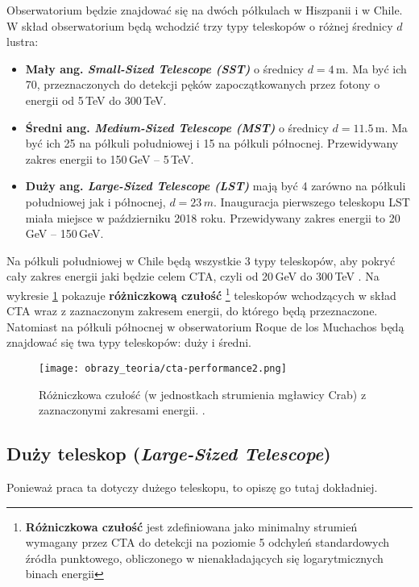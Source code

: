 \documentclass[a4paper,11pt,twoside]{article}
\begin{document}
Obserwatorium będzie znajdować się na dwóch półkulach w Hiszpanii i w Chile. W skład obserwatorium będą wchodzić trzy typy teleskopów o różnej średnicy $d$ lustra:
\begin{itemize}
\item {\bf{Mały} ang. \textsl{Small-Sized Telescope (SST)}} o średnicy $d = 4$\,m. Ma być ich 70, przeznaczonych do detekcji pęków zapoczątkowanych przez fotony o energii od 5\,TeV do 300\,TeV.
\item {\bf{Średni} ang. \textsl{Medium-Sized Telescope (MST)}} o średnicy $d = 11.5$\,m. Ma być ich 25 na półkuli południowej i 15 na półkuli północnej. Przewidywany zakres energii to 150\,GeV -- 5\,TeV.
\item {\bf{Duży} ang. \textsl{Large-Sized Telescope (LST)}} mają być 4 zarówno na półkuli południowej jak i północnej, $d = 23\,m$. Inauguracja pierwszego teleskopu LST miała miejsce w październiku 2018 roku. Przewidywany zakres energii to 20\,GeV -- 150\,GeV.
\end{itemize}
Na półkuli południowej w Chile będą wszystkie 3 typy teleskopów,
 aby pokryć cały zakres energii jaki będzie celem CTA, czyli od 20\,GeV do 300\,TeV \cite{cta_web}.
Na wykresie \ref{fig:cta_perform} pokazuje {\bf{różniczkową czułość}} \footnote{ {\bf{Różniczkowa czułość}} jest zdefiniowana jako minimalny strumień wymagany przez CTA do detekcji na poziomie 5 odchyleń standardowych źródła punktowego, obliczonego w nienakładających się logarytmicznych binach energii} teleskopów wchodzących w skład CTA wraz z zaznaczonym zakresem energii, do którego będą przeznaczone. 
Natomiast na półkuli północnej w obserwatorium Roque de los Muchachos będą znajdować się twa typy teleskopów: duży i średni.
\begin{figure}[H] 
\centering
\texttt{[image: obrazy\_teoria/cta-performance2.png]}
\caption{Różniczkowa czułość (w jednostkach strumienia mgławicy Crab) z zaznaczonymi zakresami energii. \cite{cta-concept}.}
\label{fig:cta_perform}
\end{figure}

\subsection{Duży teleskop (\textsl{Large-Sized Telescope})}
Ponieważ praca ta dotyczy dużego teleskopu, to opiszę go tutaj dokładniej. 
\end{document}
